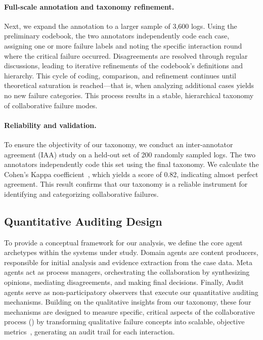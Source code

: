 \paragraph{Full-scale annotation and taxonomy refinement.}
Next, we expand the annotation to a larger sample of 3,600 logs. Using the preliminary codebook, the two annotators independently code each case, assigning one or more failure labels and noting the specific interaction round where the critical failure occurred. Disagreements are resolved through regular discussions, leading to iterative refinements of the codebook's definitions and hierarchy. This cycle of coding, comparison, and refinement continues until theoretical saturation is reached---that is, when analyzing additional cases yields no new failure categories. This process results in a stable, hierarchical taxonomy of collaborative failure modes.

\paragraph{Reliability and validation.}
To ensure the objectivity of our taxonomy, we conduct an inter-annotator agreement (IAA) study on a held-out set of 200 randomly sampled logs. The two annotators independently code this set using the final taxonomy. We calculate the Cohen's Kappa coefficient~\cite{cohen1960coefficient}, which yields a score of 0.82, indicating almost perfect agreement. This result confirms that our taxonomy is a reliable instrument for identifying and categorizing collaborative failures.

\subsection{Quantitative Auditing Design}
To provide a conceptual framework for our analysis, we define the core agent archetypes within the systems under study. Domain agents are content producers, responsible for initial analysis and evidence extraction from the case data. Meta agents act as process managers, orchestrating the collaboration by synthesizing opinions, mediating disagreements, and making final decisions. Finally, Audit agents serve as non-participatory observers that execute our quantitative auditing mechanisms. Building on the qualitative insights from our taxonomy, these four mechanisms are designed to measure specific, critical aspects of the collaborative process () by transforming qualitative failure concepts into scalable, objective metrics~\cite{lundberg2017unified,zheng2023llm_as_a_judge}, generating an audit trail for each interaction.

